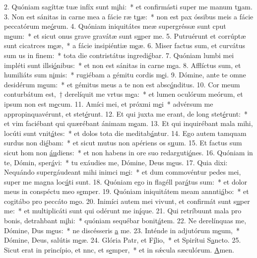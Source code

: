 2. Quóniam sagíttæ tuæ infíx sunt m\uline{i}hi:~* et confirmásti super me manum t\uline{u}am.
3. Non est sánitas in carne mea a fácie ræ t\uline{u}æ:~* non est pax óssibus meis a fácie peccatórum me\uline{ó}rum.
4. Quóniam iniquitátes meæ supergréssæ sunt cput m\uline{e}um:~* et sicut onus grave gravátæ sunt s\uline{u}per me.
5. Putruérunt et corrúptæ sunt cicatrces m\uline{e}æ,~* a fácie insipiéntiæ m\uline{e}æ.
6. Miser factus sum, et curvátus sum us in f\uline{i}nem:~* tota die contristátus ingredi\uline{é}bar.
7. Quóniam lumbi mei impléti sunt illsi\uline{ó}nibus:~* et non est sánitas in carne m\uline{e}a.
8. Afflíctus sum, et humiliáts sum n\uline{i}mis:~* rugiébam a gémitu cordis m\uline{e}i.
9. Dómine, ante te omne desidérum m\uline{e}um:~* et gémitus meus a te non est absc\uline{ó}nditus.
10. Cor meum conturbátum est,~† derelíquit me vrtus m\uline{e}a:~* et lumen oculórum meórum, et ipsum non est m\uline{e}cum.
11. Amíci mei, et próxmi m\uline{e}i~* advérsum me appropinquavérunt, et stet\uline{é}runt.
12. Et qui juxta me erant, de long stet\uline{é}runt:~* et vim faciébant qui quærébant ánimam m\uline{e}am.
13. Et qui inquirébant mala mihi, locúti sunt vnit\uline{á}tes:~* et dolos tota die meditab\uline{á}ntur.
14. Ego autem tamquam surdus non di\uline{é}bam:~* et sicut mutus non apériens os s\uline{u}um.
15. Et factus sum sicut hom non \uline{áu}diens:~* et non habens in ore suo redarguti\uline{ó}nes.
16. Quóniam in te, Dómin, sper\uline{á}vi:~* tu exáudies me, Dómine, Deus m\uline{e}us.
17. Quia dixi: Nequándo supergáudeant mihi inimci m\uline{e}i:~* et dum commovéntur pedes mei, super me magna loc\uline{ú}ti sunt.
18. Quóniam ego in flagéll par\uline{á}tus sum:~* et dolor meus in conspéctu meo s\uline{e}mper.
19. Quóniam iniquitátem meam annnti\uline{á}bo:~* et cogitábo pro peccáto m\uline{e}o.
20. Inimíci autem mei vivunt, et confirmát sunt s\uline{u}per me:~* et multiplicáti sunt qui odérunt me in\uline{í}que.
21. Qui retríbuunt mala pro bonis, detrahbant m\uline{i}hi:~* quóniam sequébar bonit\uline{á}tem.
22. Ne derelínquas me, Dómine, Dus m\uline{e}us:~* ne discésseris \uline{a} me.
23. Inténde in adjutórum m\uline{e}um,~* Dómine, Deus, salútis m\uline{e}æ.
24. Glória Patr, et F\uline{í}lio,~* et Spirítui S\uline{a}ncto.
25. Sicut erat in princípio, et nnc, et s\uline{e}mper,~* et in sǽcula sæculórum. \uline{A}men.
